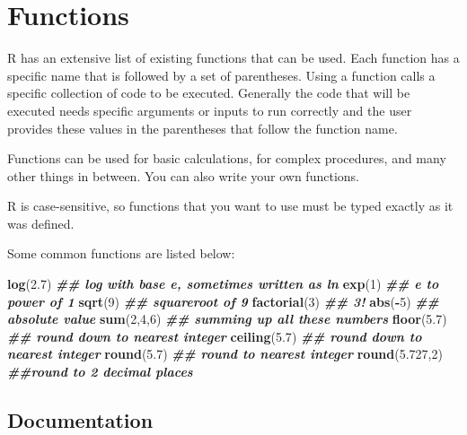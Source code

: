 \documentclass[
]{book}
\newenvironment{Shaded}{\begin{snugshade}}{\end{snugshade}}
\newcommand{\DecValTok}[1]{\textcolor[rgb]{0.00,0.00,0.81}{#1}}
\newcommand{\DocumentationTok}[1]{\textcolor[rgb]{0.56,0.35,0.01}{\textbf{\textit{#1}}}}
\newcommand{\FloatTok}[1]{\textcolor[rgb]{0.00,0.00,0.81}{#1}}
\newcommand{\FunctionTok}[1]{\textcolor[rgb]{0.13,0.29,0.53}{\textbf{#1}}}
\newcommand{\NormalTok}[1]{#1}
\newcommand{\SpecialCharTok}[1]{\textcolor[rgb]{0.81,0.36,0.00}{\textbf{#1}}}
\theoremstyle{definition}
\theoremstyle{definition}
\theoremstyle{definition}
\theoremstyle{definition}
\theoremstyle{remark}
\begin{document}
\hypertarget{functions}{%
\section{Functions}\label{functions}}

R has an extensive list of existing functions that can be used. Each function has a specific name that is followed by a set of parentheses. Using a function calls a specific collection of code to be executed. Generally the code that will be executed needs specific arguments or inputs to run correctly and the user provides these values in the parentheses that follow the function name.

Functions can be used for basic calculations, for complex procedures, and many other things in between. You can also write your own functions.

R is case-sensitive, so functions that you want to use must be typed exactly as it was defined.

Some common functions are listed below:

\begin{Shaded}
\begin{Highlighting}[]
\FunctionTok{log}\NormalTok{(}\FloatTok{2.7}\NormalTok{) }\DocumentationTok{\#\# log with base e, sometimes written as ln}
\FunctionTok{exp}\NormalTok{(}\DecValTok{1}\NormalTok{) }\DocumentationTok{\#\# e to power of 1}
\FunctionTok{sqrt}\NormalTok{(}\DecValTok{9}\NormalTok{) }\DocumentationTok{\#\# squareroot of 9}
\FunctionTok{factorial}\NormalTok{(}\DecValTok{3}\NormalTok{) }\DocumentationTok{\#\# 3!}
\FunctionTok{abs}\NormalTok{(}\SpecialCharTok{{-}}\DecValTok{5}\NormalTok{) }\DocumentationTok{\#\# absolute value}
\FunctionTok{sum}\NormalTok{(}\DecValTok{2}\NormalTok{,}\DecValTok{4}\NormalTok{,}\DecValTok{6}\NormalTok{) }\DocumentationTok{\#\# summing up all these numbers}
\FunctionTok{floor}\NormalTok{(}\FloatTok{5.7}\NormalTok{) }\DocumentationTok{\#\# round down to nearest integer}
\FunctionTok{ceiling}\NormalTok{(}\FloatTok{5.7}\NormalTok{) }\DocumentationTok{\#\# round down to nearest integer}
\FunctionTok{round}\NormalTok{(}\FloatTok{5.7}\NormalTok{) }\DocumentationTok{\#\# round to nearest integer}
\FunctionTok{round}\NormalTok{(}\FloatTok{5.727}\NormalTok{,}\DecValTok{2}\NormalTok{) }\DocumentationTok{\#\#round to 2 decimal places}
\end{Highlighting}
\end{Shaded}

\hypertarget{doc}{%
\subsection{Documentation}\label{doc}}
\end{document}
